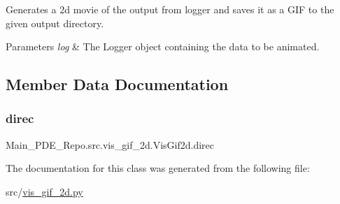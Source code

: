 Generates a 2d movie of the output from logger and saves it as a G\+IF to the given output directory. 


\begin{DoxyParams}{Parameters}
{\em log} & The Logger object containing the data to be animated. \\
\hline
\end{DoxyParams}


\subsection{Member Data Documentation}
\mbox{\label{classMain__PDE__Repo_1_1src_1_1vis__gif__2d_1_1VisGif2d_a48a438a24012dc8496b8008ab4f13da0}} 
\subsubsection{\texorpdfstring{direc}{direc}}
{\footnotesize\ttfamily Main\+\_\+\+P\+D\+E\+\_\+\+Repo.\+src.\+vis\+\_\+gif\+\_\+2d.\+Vis\+Gif2d.\+direc}



The documentation for this class was generated from the following file\+:\begin{DoxyCompactItemize}
\item 
src/\hyperlink{vis__gif__2d_8py}{vis\+\_\+gif\+\_\+2d.\+py}\end{DoxyCompactItemize}
